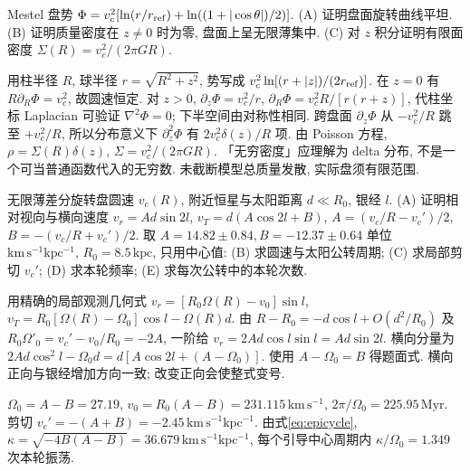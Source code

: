 \begin{exercise}
Mestel 盘势 $\Phi=v_c^2[\ln(r/r_{\rm ref})+\ln((1+|\cos\theta|)/2)]$.
(A) 证明盘面旋转曲线平坦.
(B) 证明质量密度在 $z\ne0$ 时为零, 盘面上呈无限薄集中.
(C) 对 $z$ 积分证明有限面密度 $\Sigma(R)=v_c^2/(2\pi GR)$.
\end{exercise}
\begin{solution}
用柱半径 $R$, 球半径 $r=\sqrt{R^2+z^2}$, 势写成 $v_c^2\ln[(r+|z|)/(2r_{\rm ref})]$. 在 $z=0$ 有 $R\partial_R\Phi=v_c^2$, 故圆速恒定. 对 $z>0$, $\partial_z\Phi=v_c^2/r$, $\partial_R\Phi=v_c^2R/[r(r+z)]$, 代柱坐标 Laplacian 可验证 $\nabla^2\Phi=0$; 下半空间由对称性相同. 跨盘面 $\partial_z\Phi$ 从 $-v_c^2/R$ 跳至 $+v_c^2/R$, 所以分布意义下 $\partial_z^2\Phi$ 有 $2v_c^2\delta(z)/R$ 项. 由 Poisson 方程, $\rho=\Sigma(R)\delta(z)$, $\Sigma=v_c^2/(2\pi GR)$. 「无穷密度」应理解为 delta 分布, 不是一个可当普通函数代入的无穷数. 未截断模型总质量发散, 实际盘须有限范围.
\end{solution}

\begin{exercise}
无限薄差分旋转盘圆速 $v_c(R)$, 附近恒星与太阳距离 $d\ll R_0$, 银经 $l$.
(A) 证明相对视向与横向速度 $v_r=Ad\sin2l$, $v_T=d(A\cos2l+B)$, $A=(v_c/R-v_c')/2$, $B=-(v_c/R+v_c')/2$.
取 $A=14.82\pm0.84,B=-12.37\pm0.64$ 单位 $\mathrm{km\,s^{-1}kpc^{-1}}$, $R_0=8.5\,\mathrm{kpc}$, 只用中心值:
(B) 求圆速与太阳公转周期; (C) 求局部剪切 $v_c'$; (D) 求本轮频率; (E) 求每次公转中的本轮次数.
\end{exercise}
\begin{solution}
用精确的局部观测几何式 $v_r=[R_0\Omega(R)-v_0]\sin l$, $v_T=R_0[\Omega(R)-\Omega_0]\cos l-\Omega(R)d$. 由 $R-R_0=-d\cos l+O(d^2/R_0)$ 及 $R_0\Omega'_0=v_c'-v_0/R_0=-2A$, 一阶给 $v_r=2Ad\cos l\sin l=Ad\sin2l$. 横向分量为 $2Ad\cos^2l-\Omega_0d=d[A\cos2l+(A-\Omega_0)]$. 使用 $A-\Omega_0=B$ 得题面式. 横向正向与银经增加方向一致; 改变正向会使整式变号.

$\Omega_0=A-B=27.19$, $v_0=R_0(A-B)=231.115\,\mathrm{km\,s^{-1}}$, $2\pi/\Omega_0=225.95\,\mathrm{Myr}$. 剪切 $v_c'=-(A+B)=-2.45\,\mathrm{km\,s^{-1}kpc^{-1}}$. 由式\eqref{eq:epicycle}, $\kappa=\sqrt{-4B(A-B)}=36.679\,\mathrm{km\,s^{-1}kpc^{-1}}$, 每个引导中心周期内 $\kappa/\Omega_0=1.349$ 次本轮振荡.
\end{solution}

